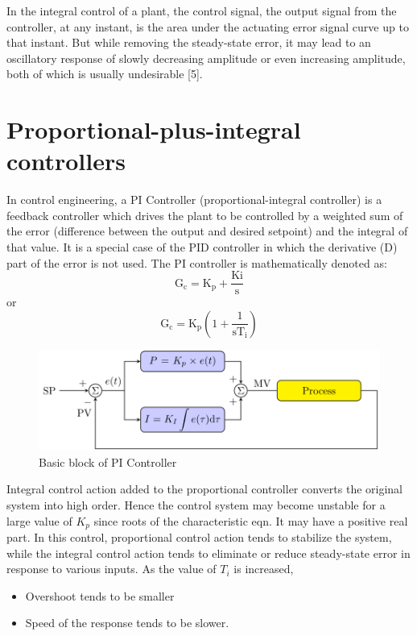 In the integral control of a plant, the control signal, the output signal from the 
controller, at any instant, is the area under the actuating error signal curve up to that 
instant. But while removing the steady-state error, it may lead to an oscillatory response 
of slowly decreasing amplitude or even increasing amplitude, both of which is usually 
undesirable [5].


\section{Proportional-plus-integral controllers}

In control engineering, a PI Controller (proportional-integral controller) is a feedback controller which drives the plant to be controlled by a weighted sum of the error (difference between the output and desired setpoint) and the integral of that value. It is a special case of the PID controller in which the derivative (D) part of the error is not used.
The PI controller is mathematically denoted as:
$$
\mathrm{G}_{\mathrm{c}}=\mathrm{K}_{\mathrm{p}}+\frac{\mathrm{Ki}}{\mathrm{s}}
$$
or
$$
\mathrm{G}_{\mathrm{c}}=\mathrm{K}_{\mathrm{p}}\left(1+\frac{1}{\mathrm{sT}_{\mathrm{i}}}\right)
$$

\begin{figure}[H]
	\includegraphics[width= \textwidth]{Basic block of PI Controller.svg.png}
	\caption{Basic block of PI Controller}
\end{figure}


Integral control action added to the proportional controller converts the original system into high order. Hence the control system may become unstable for a large value of $K_p$ since roots of the characteristic eqn. It may have a positive real part. In this control, proportional control action tends to stabilize the system, while the integral control action tends to eliminate or reduce steady-state error in response to various inputs. As the value of $T_i$ is increased, 
\begin{itemize}
\item Overshoot tends to be smaller 
\item Speed of the response tends to be slower. 
\end{itemize}


